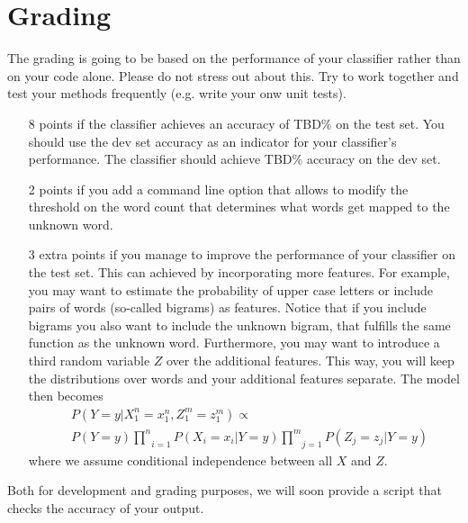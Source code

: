 \documentclass[11pt, leqno, a4paper]{article}
\begin{document}
\section{Grading}
The grading is going to be based on the performance of your classifier rather
than on your code alone. Please do not stress out about this. Try to work
together and test your methods frequently (e.g. write your onw unit tests).
\begin{itemize}
\item[8 points] if the classifier achieves an accuracy of TBD\% on the test set. You
should use the dev set accuracy as an indicator for your classifier’s
performance. The classifier should achieve TBD\% accuracy on the
dev set.
\item[2 points] if you add a command line option that allows to modify the threshold
on the word count that determines what words get mapped to the
unknown word.
\item[3 extra points] if you manage to improve the performance of your classifier on the test
set. This can achieved by incorporating more features. For example,
you may want to estimate the probability of upper case letters or
include pairs of words (so-called bigrams) as features. Notice that if
you include bigrams you also want to include the unknown bigram,
that fulfills the same function as the unknown word. Furthermore, you may want to introduce
a third random variable $ Z $ over the additional features. This way, you will keep the 
distributions over words and your additional features separate. The model then becomes
\begin{align*}
&P(Y=y|X_{1}^{n}=x_{1}^{n},Z_{1}^{m}=z_{1}^{m}) \propto \\ &P(Y=y)\underset{i=1}{\overset{n}{\prod}} P(X_{i}=x_{i}|Y=y)\underset{j=1}{\overset{m}{\prod}}P(Z_{j}=z_{j}|Y=y)
\end{align*}
where we assume conditional independence between
all $ X $ and $ Z $.
\end{itemize}

Both for development and grading purposes, we will soon provide a script that checks the accuracy
of your output.
\end{document}
